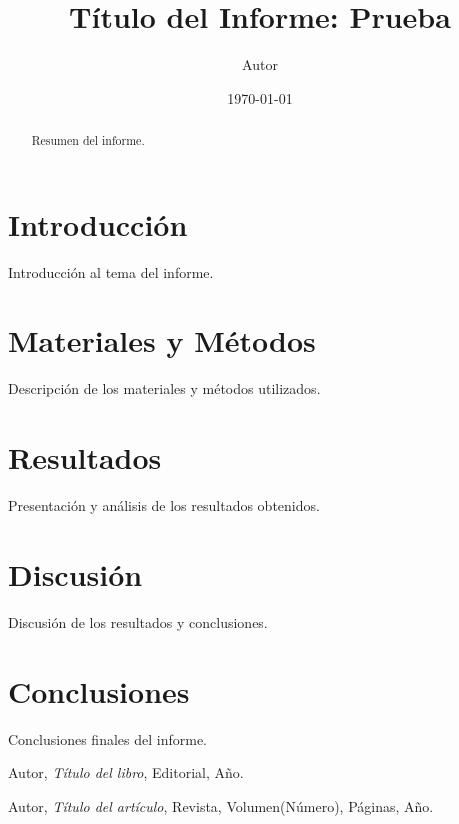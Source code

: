 \documentclass[a4paper,12pt]{article}
\title{Título del Informe: Prueba}
\author{Autor}
\date{\today}
\begin{document}
\maketitle

\begin{abstract}
    Resumen del informe.
\end{abstract}

\tableofcontents

\section{Introducción}
Introducción al tema del informe.

\section{Materiales y Métodos}
Descripción de los materiales y métodos utilizados.

\section{Resultados}
Presentación y análisis de los resultados obtenidos.

\section{Discusión}
Discusión de los resultados y conclusiones.

\section{Conclusiones}
Conclusiones finales del informe.

\begin{thebibliography}{9}
    Autor, \textit{Título del libro}, Editorial, Año.
    
    Autor, \textit{Título del artículo}, Revista, Volumen(Número), Páginas, Año.
\end{thebibliography}
\end{document}
